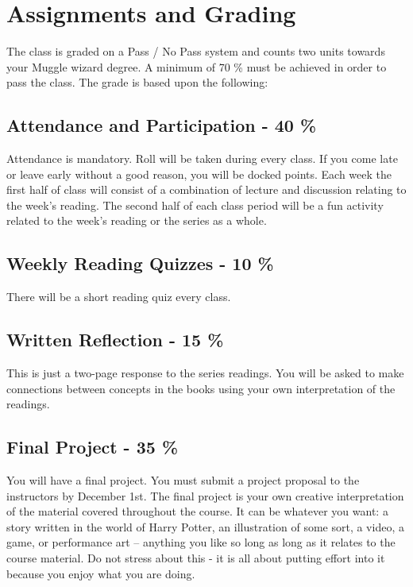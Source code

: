 \documentclass{article}
\begin{document}
\begin{table} [h!]
\begin{large}
\begin{center}
\begin{tabular}{c|c|c}
    \end{tabular}

\end{center}
\end{large}


\end{table}



\section{Assignments and Grading}
	The class is graded on a Pass / No Pass system and counts two units towards your Muggle wizard degree. A minimum of 70 \% must be achieved in order to pass the class. 
	The grade is based upon the following: 

\subsection*{Attendance and Participation - 40 \%}	
	Attendance is mandatory. Roll will be taken during every class. If you come late or leave early without a good reason, you will be docked points. Each week the first half of class will consist of a combination of lecture and discussion relating to the week’s reading. The second half of each class period will be a fun activity related to the week’s reading or the series as a whole. 

\subsection*{Weekly Reading Quizzes - 10 \%}
    There will be a short reading quiz every class.
	
\subsection*{Written Reflection - 15 \%}		
	This is just a two-page response to the series readings. You will be asked to make connections between concepts in the books using your own interpretation of the readings.

\subsection*{Final Project - 35 \%}		
    You will have a final project. You must submit a project proposal to the instructors by December 1st. The final project is your own creative interpretation of the material covered throughout the course. It can be whatever you want: a story written in the world of Harry Potter, an illustration of some sort, a video, a game, or performance art – anything you like so long as long as it relates to the course material. Do not stress about this - it is all about putting effort into it because you enjoy what you are doing.
\end{document}
